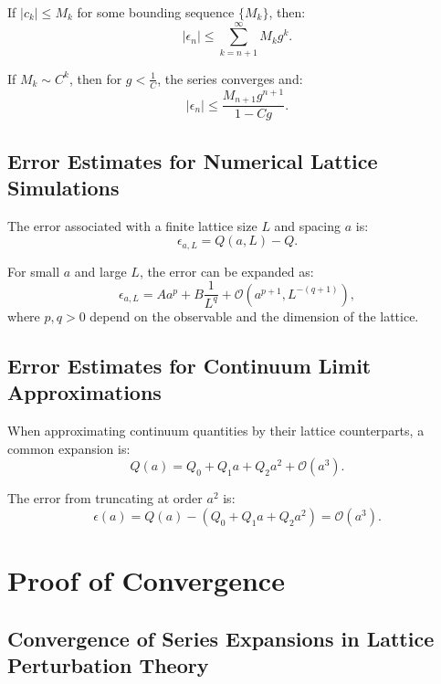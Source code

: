 If \(|c_k| \leq M_k\) for some bounding sequence \(\{M_k\}\), then:
\begin{equation}
|\epsilon_n| \leq \sum_{k=n+1}^\infty M_k g^k.
\end{equation}

If \(M_k \sim C^k\), then for \(g < \frac{1}{C}\), the series converges and:
\begin{equation}
|\epsilon_n| \leq \frac{M_{n+1} g^{n+1}}{1 - Cg}.
\end{equation}

\subsection{Error Estimates for Numerical Lattice Simulations}

The error associated with a finite lattice size \(L\) and spacing \(a\) is:
\begin{equation}
\epsilon_{a, L} = Q(a, L) - Q.
\end{equation}

For small \(a\) and large \(L\), the error can be expanded as:
\begin{equation}
\epsilon_{a, L} = A a^p + B \frac{1}{L^q} + \mathcal{O}(a^{p+1}, L^{-(q+1)}),
\end{equation}
where \(p, q > 0\) depend on the observable and the dimension of the lattice.

\subsection{Error Estimates for Continuum Limit Approximations}

When approximating continuum quantities by their lattice counterparts, a common expansion is:
\begin{equation}
Q(a) = Q_0 + Q_1 a + Q_2 a^2 + \mathcal{O}(a^3).
\end{equation}

The error from truncating at order \(a^2\) is:
\begin{equation}
\epsilon(a) = Q(a) - (Q_0 + Q_1 a + Q_2 a^2) = \mathcal{O}(a^3).
\end{equation}



\section{Proof of Convergence}

\subsection{Convergence of Series Expansions in Lattice Perturbation Theory}

